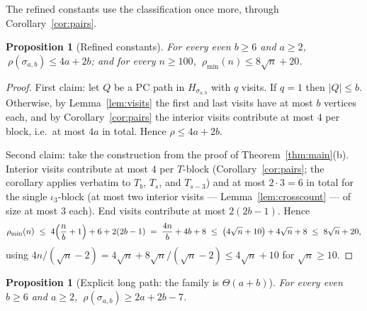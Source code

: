 \documentclass[11pt]{article}
\newtheorem{proposition}[theorem]{Proposition}
\theoremstyle{definition}
\newcommand{\pmin}{\rho_{\min}}
\begin{document}
The refined constants use the classification once more, through
Corollary~\ref{cor:pairs}.

\begin{proposition}[Refined constants]\label{prop:refined}
For every even $b \ge 6$ and $a \ge 2$, $\ \rho(\sigma_{a,b}) \le 4a + 2b$; and for
every $n \ge 100$, $\ \pmin(n) \le 8\sqrt n + 20$.
\end{proposition}

\begin{proof}
First claim: let $Q$ be a PC path in $H_{\sigma_{a,b}}$ with $q$ visits. If $q = 1$
then $|Q| \le b$. Otherwise, by Lemma~\ref{lem:visits} the first and last visits have
at most $b$ vertices each, and by Corollary~\ref{cor:pairs} the interior visits
contribute at most $4$ per block, i.e.\ at most $4a$ in total. Hence
$\rho \le 4a + 2b$.

Second claim: take the construction from the proof of Theorem~\ref{thm:main}(b).
Interior visits contribute at most $4$ per $T$-block (Corollary~\ref{cor:pairs};
the corollary applies verbatim to $T_b$, $T_s$, and $T_{s-3}$) and at most
$2 \cdot 3 = 6$ in total for the single $\iota_3$-block (at most two interior
visits --- Lemma~\ref{lem:crosscount} --- of size at most $3$ each). End visits
contribute at most $2(2b - 1)$. Hence
\[
\pmin(n) \;\le\; 4\Bigl(\frac n b + 1\Bigr) + 6 + 2(2b-1)
\;=\; \frac{4n}{b} + 4b + 8
\;\le\; \bigl(4\sqrt n + 10\bigr) + 4\sqrt n + 8
\;\le\; 8\sqrt n + 20,
\]
using $4n/(\sqrt n - 2) = 4\sqrt n + 8\sqrt n/(\sqrt n - 2) \le 4\sqrt n + 10$ for
$\sqrt n \ge 10$.
\end{proof}

\begin{proposition}[Explicit long path: the family is $\Theta(a+b)$]
\label{prop:lower}
For every even $b \ge 6$ and $a \ge 2$, $\ \rho(\sigma_{a,b}) \ge 2a + 2b - 7$.
\end{proposition}
\end{document}

